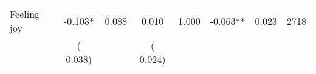\begin{tabular}{l*{7}{c}}
 Feeling joy       &             -0.103*       &        0.088  &              0.010       &        1.000  &             -0.063**       &              0.023 &  2718 \\ 
                       &       (       0.038)             &                               &       (       0.024)                     &                               &                                               &                                &                      \\ 

\hline \end{tabular}